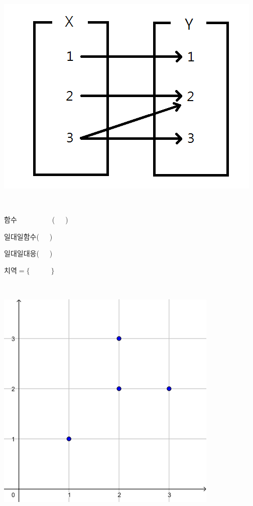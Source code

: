\documentclass[a4paper]{oblivoir}
\begin{document}

%
\begin{minipage}{0.4\textwidth}
\includegraphics[width=\textwidth]{relation_1}
\end{minipage}
~
\begin{minipage}{0.20\textwidth}
함수~~~~~~~~~~(~~~)\par\bigskip
일대일함수(~~~)\par\bigskip
일대일대응(~~~)\par\bigskip
치역\(=\{\qquad\quad\}\)
\end{minipage}
~
\begin{minipage}{0.35\textwidth}
\includegraphics[width=0.8\textwidth]{relation_1-}
\end{minipage}
\end{document}
